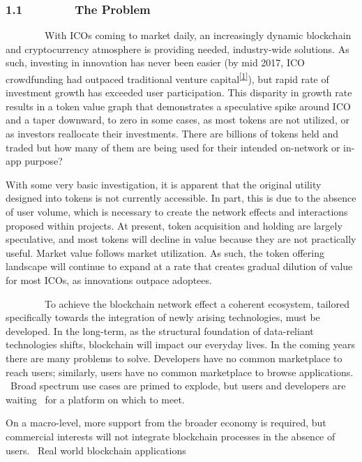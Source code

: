 \documentclass[]{article}
\begin{document}
\hypertarget{h.ptf3ammqc60}{%
\subsubsection{\texorpdfstring{{1.1~~~~~~~~The
Problem}}{1.1~~~~~~~~The Problem}}\label{h.ptf3ammqc60}}

{~~~~~~~~With ICOs coming to market daily, an increasingly dynamic
blockchain and cryptocurrency atmosphere is providing needed,
industry-wide solutions. As such, investing in innovation has never been
easier (by mid 2017, ICO crowdfunding had outpaced traditional venture
capital}\textsuperscript{\protect\hyperlink{ftnt1}{{[}1{]}}}{), but
rapid rate of investment growth has exceeded user participation. This
disparity in growth rate results in a token value graph that
demonstrates a speculative spike around ICO and a taper downward, to
zero in some cases, as most tokens are not utilized, or as investors
reallocate their investments. There are billions of tokens held and
traded but how many of them are being used for their intended on-network
or in-app purpose?}

{}

{With some very basic investigation, it is apparent that the original
utility designed into tokens is not currently accessible. In part, this
is due to the absence of user volume, which is necessary to create the
network effects and interactions proposed within projects. At present,
token acquisition and holding are largely speculative, and most tokens
will decline in value because they are not practically useful. Market
value follows market utilization. As such, the token offering landscape
will continue to expand at a rate that creates gradual dilution of value
for most ICOs, as innovations outpace adoptees.}

{}

{~~~~~~~~To achieve the blockchain network effect a coherent ecosystem,
tailored specifically towards the integration of newly arising
technologies, must be developed. In the long-term, as the structural
foundation of data-reliant technologies shifts, blockchain will impact
our everyday lives. In the coming years there are many problems to
solve. Developers have no common marketplace to reach users; similarly,
users have no common marketplace to browse applications. ~Broad spectrum
use cases are primed to explode, but users and developers are waiting
~for a platform on which to meet. }

{}

{On a macro-level, more support from the broader economy is required,
but commercial interests will not integrate blockchain processes in the
absence of users. ~Real world blockchain applications }
\end{document}
